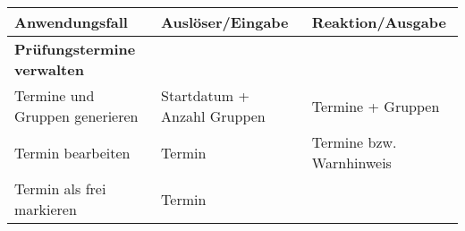 \documentclass[]{article}
\begin{document}
\begin{longtable}[]{@{}lll@{}}
\toprule
\begin{minipage}[b]{0.40\columnwidth}\raggedright
Anwendungsfall\strut
\end{minipage} & \begin{minipage}[b]{0.27\columnwidth}\raggedright
Auslöser/Eingabe\strut
\end{minipage} & \begin{minipage}[b]{0.24\columnwidth}\raggedright
Reaktion/Ausgabe\strut
\end{minipage}\tabularnewline
\midrule
\endhead
\begin{minipage}[t]{0.40\columnwidth}\raggedright
\textbf{Prüfungstermine verwalten}\strut
\end{minipage} & \begin{minipage}[t]{0.27\columnwidth}\raggedright
\strut
\end{minipage} & \begin{minipage}[t]{0.24\columnwidth}\raggedright
\strut
\end{minipage}\tabularnewline
\begin{minipage}[t]{0.40\columnwidth}\raggedright
Termine und Gruppen generieren\strut
\end{minipage} & \begin{minipage}[t]{0.27\columnwidth}\raggedright
Startdatum + Anzahl Gruppen\strut
\end{minipage} & \begin{minipage}[t]{0.24\columnwidth}\raggedright
Termine + Gruppen\strut
\end{minipage}\tabularnewline
\begin{minipage}[t]{0.40\columnwidth}\raggedright
Termin bearbeiten\strut
\end{minipage} & \begin{minipage}[t]{0.27\columnwidth}\raggedright
Termin\strut
\end{minipage} & \begin{minipage}[t]{0.24\columnwidth}\raggedright
Termine bzw. Warnhinweis\strut
\end{minipage}\tabularnewline
\begin{minipage}[t]{0.40\columnwidth}\raggedright
Termin als frei markieren\strut
\end{minipage} & \begin{minipage}[t]{0.27\columnwidth}\raggedright
Termin\strut
\end{minipage} & \begin{minipage}[t]{0.24\columnwidth}\raggedright

\end{minipage}
\end{longtable}
\end{document}
